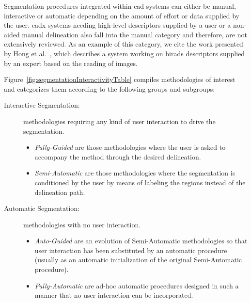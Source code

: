 \documentclass[authoryear,preprint,review,12pt]{elsarticle}
\begin{document}
Segmentation procedures integrated within \ac{cad} systems can either be manual, interactive or automatic depending on the amount of effort or data supplied by the user. 
\ac{cadx} systems needing high-level descriptors supplied by a user or a non-aided manual delineation also fall into the manual category and therefore, are not extensively reviewed. As an example of this category, we cite the work presented by Hong et al.~\cite{Hong:2005p14207}, which describes a system working on \ac{birads} descriptors supplied by an expert based on the reading of images. 


Figure~\ref{fig:segmentationInteractivityTable} compiles methodologies of interest and categorizes them according to the following groups and subgroups:

\begin{description}
\item[Interactive Segmentation:] methodologies requiring any kind of user interaction to drive the segmentation.
	\begin{itemize}
		\item \emph{Fully-Guided} are those methodologies where the user is asked to accompany the method through the desired delineation.
		\item \emph{Semi-Automatic} are those methodologies where the segmentation is conditioned by the user by means of labeling the regions instead of the delineation path.
	\end{itemize} 
\item[Automatic Segmentation:] methodologies with no user interaction.
	\begin{itemize}
	\item \emph{Auto-Guided} are an evolution of Semi-Automatic methodologies so that user interaction has been substituted by an automatic procedure (usually as an automatic initialization of the original Semi-Automatic procedure). 
	
	\item \emph{Fully-Automatic} are ad-hoc automatic procedures designed in such a manner that no user interaction can be incorporated.
	\end{itemize} 
\end{description}
\end{document}
